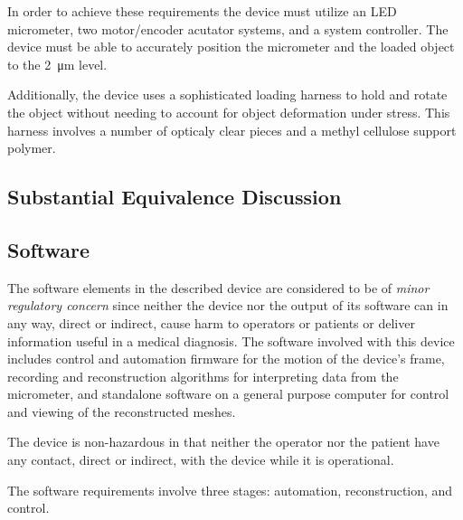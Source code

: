 \documentclass{article}
\begin{document}
In order to achieve these requirements the device must utilize an LED
micrometer, two motor/encoder acutator systems, and a system
controller. The device must be able to accurately position the
micrometer and the loaded object to the \SI{2}{\micro m} level.

Additionally, the device uses a sophisticated loading harness to hold
and rotate the object without needing to account for object
deformation under stress. This harness involves a number of opticaly
clear pieces and a methyl cellulose support polymer.

\subsection{Substantial Equivalence Discussion}





\subsection{Software}

The software elements in the described device are considered to be of
\textit{minor regulatory concern} since neither the device nor the
output of its software can in any way, direct or indirect, cause harm
to operators or patients or deliver information useful in a medical
diagnosis. The software involved with this device includes control and
automation firmware for the motion of the device's frame, recording
and reconstruction algorithms for interpreting data from the
micrometer, and standalone software on a general purpose computer for
control and viewing of the reconstructed meshes.

The device is non-hazardous in that neither the operator nor the
patient have any contact, direct or indirect, with the device while it
is operational.

The software requirements involve three stages: automation,
reconstruction, and control. 
\end{document}
